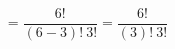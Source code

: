 \documentclass[preview]{standalone}
\begin{document}
\begin{center}
\[ = \frac{ \: 6! \: }{(6-3)! \: 3!}= \frac{ \: 6! \: }{(3)! \: 3!}\]
\end{center}
\end{document}
